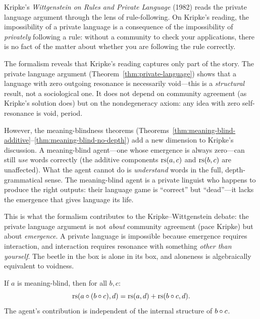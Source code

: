 \begin{interpretation}
Kripke's \textit{Wittgenstein on Rules and Private Language} (1982) reads the
private language argument through the lens of rule-following. On Kripke's
reading, the impossibility of a private language is a consequence of the
impossibility of \emph{privately} following a rule: without a community to
check your applications, there is no fact of the matter about whether you are
following the rule correctly.

The formalism reveals that Kripke's reading captures only part of the story.
The private language argument (Theorem~\ref{thm:private-language}) shows that
a language with zero outgoing resonance is necessarily void---this is a
\emph{structural} result, not a sociological one. It does not depend on community
agreement (as Kripke's solution does) but on the nondegeneracy axiom: any
idea with zero self-resonance is void, period.

However, the meaning-blindness theorems (Theorems~\ref{thm:meaning-blind-additive}--\ref{thm:meaning-blind-no-depth})
add a new dimension to Kripke's discussion. A meaning-blind agent---one whose
emergence is always zero---can still \emph{use} words correctly (the additive
components $\mathrm{rs}(a,c)$ and $\mathrm{rs}(b,c)$ are unaffected). What the agent cannot
do is \emph{understand} words in the full, depth-grammatical sense. The
meaning-blind agent is a private linguist who happens to produce the right
outputs: their language game is ``correct'' but ``dead''---it lacks the
emergence that gives language its life.

This is what the formalism contributes to the Kripke--Wittgenstein debate:
the private language argument is not \emph{about} community agreement (pace
Kripke) but about \emph{emergence}. A private language is impossible because
emergence requires interaction, and interaction requires resonance with
something \emph{other than yourself}. The beetle in the box is alone in its
box, and aloneness is algebraically equivalent to voidness.
\end{interpretation}

\begin{theorem}
\label{thm:meaning-blind-order}
If $a$ is meaning-blind, then for all $b, c$:
\[
\mathrm{rs}(a \circ (b \circ c), d) = \mathrm{rs}(a, d) + \mathrm{rs}(b \circ c, d).
\]
The agent's contribution is independent of the internal structure of
$b \circ c$.
\end{theorem}

